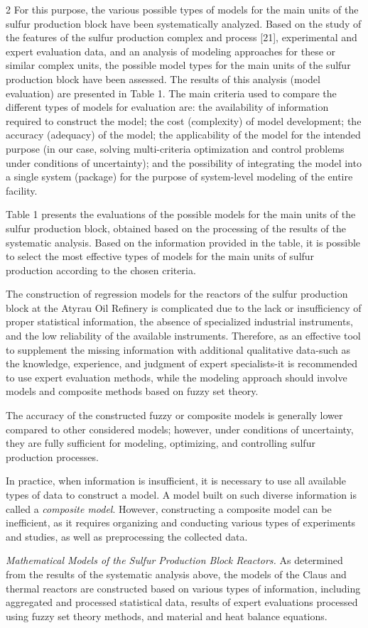 \begin{multicols}{2}
For this purpose, the various possible types of models for the main
units of the sulfur production block have been systematically analyzed.
Based on the study of the features of the sulfur production complex and
process {[}21{]}, experimental and expert evaluation data, and an
analysis of modeling approaches for these or similar complex units, the
possible model types for the main units of the sulfur production block
have been assessed. The results of this analysis (model evaluation) are
presented in Table 1. The main criteria used to compare the different
types of models for evaluation are: the availability of information
required to construct the model; the cost (complexity) of model
development; the accuracy (adequacy) of the model; the applicability of
the model for the intended purpose (in our case, solving multi-criteria
optimization and control problems under conditions of uncertainty); and
the possibility of integrating the model into a single system (package)
for the purpose of system-level modeling of the entire facility.

Table 1 presents the evaluations of the possible models for the main
units of the sulfur production block, obtained based on the processing
of the results of the systematic analysis. Based on the information
provided in the table, it is possible to select the most effective types
of models for the main units of sulfur production according to the
chosen criteria.

The construction of regression models for the reactors of the sulfur
production block at the Atyrau Oil Refinery is complicated due to the
lack or insufficiency of proper statistical information, the absence of
specialized industrial instruments, and the low reliability of the
available instruments. Therefore, as an effective tool to supplement the
missing information with additional qualitative data-such as the
knowledge, experience, and judgment of expert specialists-it is
recommended to use expert evaluation methods, while the modeling
approach should involve models and composite methods based on fuzzy set
theory.

The accuracy of the constructed fuzzy or composite models is generally
lower compared to other considered models; however, under conditions of
uncertainty, they are fully sufficient for modeling, optimizing, and
controlling sulfur production processes.

In practice, when information is insufficient, it is necessary to use
all available types of data to construct a model. A model built on such
diverse information is called a \emph{composite model}. However,
constructing a composite model can be inefficient, as it requires
organizing and conducting various types of experiments and studies, as
well as preprocessing the collected data.

\emph{Mathematical Models of the Sulfur Production Block Reactors.} As
determined from the results of the systematic analysis above, the models
of the Claus and thermal reactors are constructed based on various types
of information, including aggregated and processed statistical data,
results of expert evaluations processed using fuzzy set theory methods,
and material and heat balance equations.
\end{multicols}

